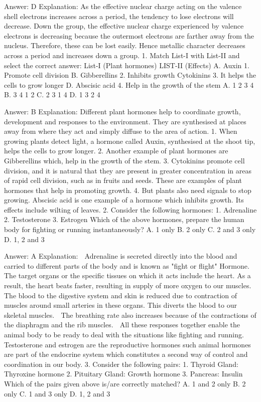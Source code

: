 Answer: D
Explanation: As the effective nuclear charge acting on the valence shell electrons increases across a period, the tendency to lose electrons will decrease. Down the group, the effective nuclear charge experienced by valence electrons is decreasing because the outermost electrons are farther away from the nucleus. Therefore, these can be lost easily. Hence metallic character decreases across a period and increases down a group. 1. Match List-I with List-II and select the correct 
answer: List-I (Plant hormones) LIST-II (Effects) A. Auxin 1. Promote cell division B. Gibberellins 2. Inhibits 
growth Cytokinins 3. It helps the cells to grow longer D. Abscisic acid 4. Help in the growth of the stem A. 1 2 3 4 B. 3 4 1 2 C. 2 3 1 4 D. 1 3 2 4 

Answer: B
Explanation: Different plant hormones help to coordinate growth, development and responses to the environment. They are synthesised at places away from where they act and simply diffuse to the area of action. 1. When growing plants detect light, a hormone called Auxin, synthesised at the shoot tip, helps the cells to grow longer. 2. Another example of plant hormones are Gibberellins which, help in the growth of the stem. 3. Cytokinins promote cell division, and it is natural that they are present in greater concentration in areas of rapid cell division, such as in fruits and seeds. These are examples of plant hormones that help in promoting growth. 4. But plants also need signals to stop growing. Abscisic acid is one example of a hormone which inhibits growth. Its effects include wilting of leaves. 2. Consider the following hormones: 1. Adrenaline 2. Testosterone 3. Estrogen Which of the above hormones, prepare the human body for fighting or running instantaneously? A. 1 only B. 2 only C. 2 and 3 only D. 1, 2 and 3 

Answer: A
Explanation:  Adrenaline is secreted directly into the blood and carried to different parts of the body and is known as "fight or flight" Hormone.  The target organs or the specific tissues on which it acts include the heart. As a result, the heart beats faster, resulting in supply of more oxygen to our muscles.  The blood to the digestive system and skin is reduced due to contraction of muscles around small arteries in these organs. This diverts the blood to our skeletal muscles.  The breathing rate also increases because of the contractions of the diaphragm and the rib muscles.  All these responses together enable the animal body to be ready to deal with the situations like fighting and running.  Testosterone and estrogen are the reproductive hormones such animal hormones are part of the endocrine system which constitutes a second way of control and coordination in our body. 3. Consider the following pairs: 1. Thyroid Gland: Thyroxine hormone 2. Pituitary Gland: Growth hormone 3. Pancreas: Insulin Which of the pairs given above is/are correctly matched? A. 1 and 2 only B. 2 only C. 1 and 3 only D. 1, 2 and 3 

